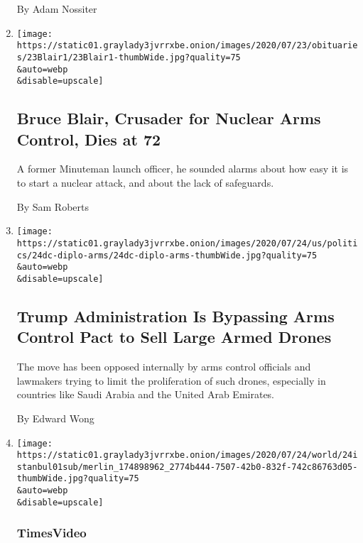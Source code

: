 \begin{enumerate}
  By Adam Nossiter
\item
  \href{/2020/07/24/us/bruce-blair-dead.html}{}

  \texttt{[image: https://static01.graylady3jvrrxbe.onion/images/2020/07/23/obituaries/23Blair1/23Blair1-thumbWide.jpg?quality=75\\\&auto=webp\\\&disable=upscale]}

  \hypertarget{bruce-blair-crusader-for-nuclear-arms-control-dies-at-72}{%
  \subsection{Bruce Blair, Crusader for Nuclear Arms Control, Dies at
  72}\label{bruce-blair-crusader-for-nuclear-arms-control-dies-at-72}}

  A former Minuteman launch officer, he sounded alarms about how easy it
  is to start a nuclear attack, and about the lack of safeguards.

  By Sam Roberts
\item
  \href{/2020/07/24/us/politics/trump-arms-sales-drones.html}{}

  \texttt{[image: https://static01.graylady3jvrrxbe.onion/images/2020/07/24/us/politics/24dc-diplo-arms/24dc-diplo-arms-thumbWide.jpg?quality=75\\\&auto=webp\\\&disable=upscale]}

  \hypertarget{trump-administration-is-bypassing-arms-control-pact-to-sell-large-armed-drones}{%
  \subsection{Trump Administration Is Bypassing Arms Control Pact to
  Sell Large Armed
  Drones}\label{trump-administration-is-bypassing-arms-control-pact-to-sell-large-armed-drones}}

  The move has been opposed internally by arms control officials and
  lawmakers trying to limit the proliferation of such drones, especially
  in countries like Saudi Arabia and the United Arab Emirates.

  By Edward Wong
\item
  \href{/video/world/middleeast/100000007255122/hagia-sophia-mosque-prayers.html}{}

  \texttt{[image: https://static01.graylady3jvrrxbe.onion/images/2020/07/24/world/24istanbul01sub/merlin\_174898962\_2774b444-7507-42b0-832f-742c86763d05-thumbWide.jpg?quality=75\\\&auto=webp\\\&disable=upscale]}

  \hypertarget{timesvideo}{%
  \subsubsection{TimesVideo}\label{timesvideo}}


\end{enumerate}
